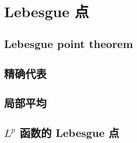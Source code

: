 \section{Lebesgue 点}
\label{b1:sec:1404}


\subsection{Lebesgue point theorem}
\label{b1:subsec:140401}

\subsection{精确代表}
\label{b1:subsec:140402}

\subsection{局部平均}
\label{b1:subsec:140403}

\subsection{\texorpdfstring{\(L^p\)}{Lp} 函数的 Lebesgue 点}
\label{b1:subsec:140404}


